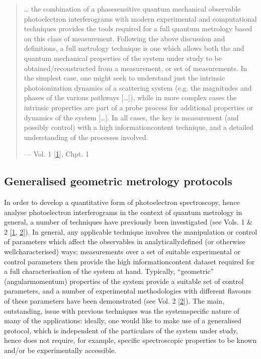 \documentclass[letterpaper,table,10pt,english]{jupyterBook}
\begin{document}
\begin{quote}
\sphinxAtStartPar
… the combination of a phase\sphinxhyphen{}sensitive quantum mechanical observable \sphinxhyphen{} photoelectron interferograms \sphinxhyphen{} with modern experimental and computational techniques provides the tools required for a full quantum metrology based on this class of measurement. Following the above discussion and definitions, a full metrology technique is one which allows both the  and  quantum mechanical properties of the system under study to be obtained/reconstructed from a measurement, or set of measurements. In the simplest case, one might seek to understand just the intrinsic photoionization dynamics of a scattering system (e.g. the magnitudes and phases of the various pathways {[}…{]}), while in more complex cases the intrinsic properties are part of a probe process for additional properties or dynamics of the system {[}…{]}. In all cases, the key is measurement (and possibly control) with a high information\sphinxhyphen{}content technique, and a detailed understanding of the processes involved.

\begin{flushright}
--- Vol. 1 {[}\hyperlink{cite.backmatter/bibliography:id613}{1}{]}, Chpt. 1
\end{flushright}
\end{quote}


\subsection{Generalised geometric metrology protocols}
\label{\detokenize{part1/main_intro_051122:generalised-geometric-metrology-protocols}}
\sphinxAtStartPar
In order to develop a quantitative form of photoelectron spectroscopy, hence analyse photoelectron interferograms in the context of quantum metrology in general, a number of techniques have previously been investigated (see  Vols. 1 \& 2 {[}\hyperlink{cite.backmatter/bibliography:id613}{1}, \hyperlink{cite.backmatter/bibliography:id614}{2}{]}). In general, any applicable technique involves the manipulation or control of parameters which affect the observables in analytically\sphinxhyphen{}defined (or otherwise well\sphinxhyphen{}characterised) ways; measurements over a set of suitable experimental or control parameters then provide the high information\sphinxhyphen{}content dataset required for a full characterisation of the system at hand. Typically, “geometric” (angular\sphinxhyphen{}momentum) properties of the system provide a suitable set of control parameters, and a number of experimental methodologies with different flavours of these parameters have been demonstrated (see  Vol. 2 {[}\hyperlink{cite.backmatter/bibliography:id614}{2}{]}). The main, outstanding, issue with previous techniques was the system\sphinxhyphen{}specific nature of many of the applications: ideally, one would like to make use of a generalised protocol, which is independent of the particulars of the system under study, hence does not require, for example, specific spectroscopic properties to be known and/or be experimentally accessible.
\end{document}
